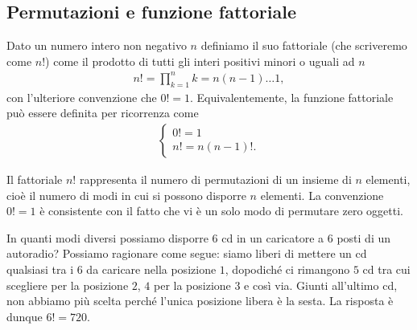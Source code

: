 \subsection{Permutazioni e funzione fattoriale}

Dato un numero intero non negativo $n$ definiamo il suo fattoriale (che
scriveremo come $n!$) come il prodotto di tutti gli interi positivi minori o
uguali ad $n$
\begin{align}
  n! = \prod_{k=1}^{n} k = n (n - 1)\ldots 1,
\end{align}
con l'ulteriore convenzione che $0! = 1$. Equivalentemente, la funzione
fattoriale può essere definita per ricorrenza come
\begin{align}
  \begin{cases}
    0! = 1\\
    n! = n (n - 1)!.
  \end{cases}
\end{align}

Il fattoriale $n!$ rappresenta il numero di permutazioni di un insieme di
$n$ elementi, cioè il numero di modi in cui si possono disporre $n$
elementi. La convenzione $0! = 1$ è consistente con il fatto che vi è
un solo modo di permutare zero oggetti.

\begin{examplebox}
  \begin{example}
    In quanti modi diversi possiamo disporre $6$ cd in un caricatore a $6$ posti
    di un autoradio? Possiamo ragionare come segue: siamo liberi di mettere un
    cd qualsiasi tra i $6$ da caricare nella posizione $1$, dopodiché ci
    rimangono $5$ cd tra cui scegliere per la posizione $2$, $4$ per la
    posizione $3$ e così via. Giunti all'ultimo cd, non abbiamo più scelta
    perché l'unica posizione libera è la sesta.
    La risposta è dunque $6! = 720$.
  \end{example}
\end{examplebox}


